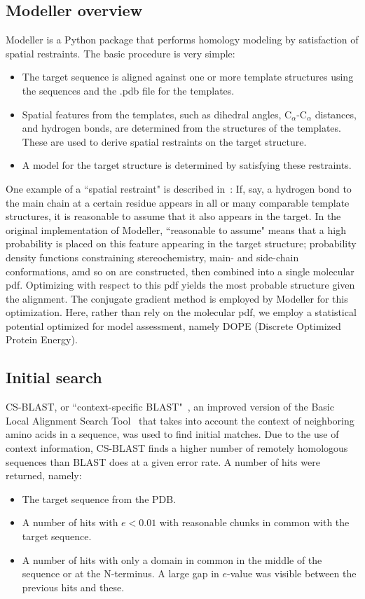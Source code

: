 \documentclass[]{report}   %
\begin{document}
\subsection*{Modeller overview}
Modeller is a Python package that performs homology modeling by satisfaction of spatial restraints. The basic procedure is very simple:
\begin{itemize}
\item The target sequence is aligned against one or more template structures using the sequences and the .pdb file for the templates.
\item Spatial features from the templates, such as dihedral angles, C$_\alpha$-C$_\alpha$ distances, and hydrogen bonds, are determined from the structures of the templates. These are used to derive spatial restraints on the target structure.~\cite{sali1994comparative}
\item A model for the target structure is determined by satisfying these restraints.
\end{itemize}
 
One example of a ``spatial restraint" is described in~\cite{sali1994comparative}: If, say, a hydrogen bond to the main chain at a certain residue appears in all or many comparable template structures, it is reasonable to assume that it also appears in the target. In the original implementation of Modeller, ``reasonable to assume" means that a high probability is placed on this feature appearing in the target structure; probability density functions constraining stereochemistry, main- and side-chain conformations, amd so on are constructed, then combined into a single molecular pdf. Optimizing with respect to this pdf yields the most probable structure given the alignment. The conjugate gradient method is employed by Modeller for this optimization. Here, rather than rely on the molecular pdf, we employ a statistical potential optimized for model assessment, namely DOPE (Discrete Optimized Protein Energy).~\cite{DOPE}

\subsection*{Initial search}
CS-BLAST, or ``context-specific BLAST"~\cite{csblast}, an improved version of the Basic Local Alignment Search Tool~\cite{BLAST} that takes into account the context of neighboring amino acids in a sequence, was used to find initial matches. Due to the use of context information, CS-BLAST finds a higher number of remotely homologous sequences than BLAST does at a given error rate. A number of hits were returned, namely:
\begin{itemize}
\item The target sequence from the PDB.
\item A number of hits with $e < 0.01$ with reasonable chunks in common with the target sequence.
\item A number of hits with only a domain in common in the middle of the sequence or at the N-terminus. A large gap in $e$-value was visible between the previous hits and these.
\end{itemize}
\end{document}
